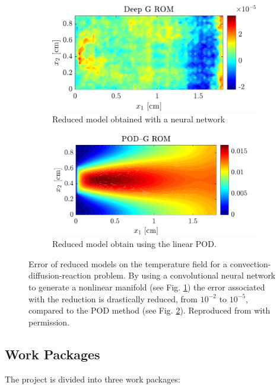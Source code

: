 \documentclass[12pt]{article}
\begin{document}
	\begin{figure}[t]
		
		\begin{subfigure}[t]{0.465\textwidth}
			\includegraphics[width=\columnwidth]{DGROM_T_param1.pdf} 
			\caption{Reduced model obtained with a neural network}
			\label{fig:DG_ROM}
		\end{subfigure}\hfill
		\begin{subfigure}[t]{0.48\textwidth}
			\includegraphics[width=\columnwidth]{GROM_T_param1.pdf}%
			\caption{Reduced model obtain using the linear POD.}
			\label{fig:POD_ROM}
		\end{subfigure}
		\caption[]{Error of reduced models on the temperature field for a convection-diffusion-reaction problem. By using a convolutional neural network to generate a nonlinear manifold (see Fig. \ref{fig:DG_ROM}) the error associated with the reduction is drastically reduced, from $10^{-2}$ to $10^{-5}$, compared to the POD method (see Fig. \ref{fig:POD_ROM}). Reproduced from \cite{lee2020} with permission.}%
		\label{fig:deepROM}%
	\end{figure}
	
	
	\subsection{Work Packages}
	The project is divided into three work packages:
	
\end{document}

